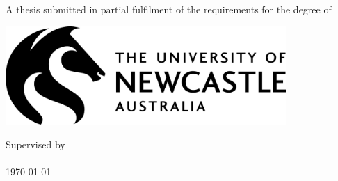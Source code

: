 \begin{titlepage}
\makeatletter

	\vspace*{\fill}
		
	\begin{flushleft}

		\begin{flushleft}
			\huge\textbf{\textsf{\@title}}
		\end{flushleft}

		\vspace{0.5cm}\par
		\LARGE\textbf{\@author}

		\vspace{0.5cm}\par
		\Large{A thesis submitted in partial fulfilment of the requirements for the degree of \degree}

	\end{flushleft}

	\vfill

	\begin{center}

		\begin{center}
			\includegraphics[width=0.8\textwidth]{images/title/uon_logo.jpg}
		\end{center}

		\large{Supervised by \supervisor \\ \institute \\ \today}

	\end{center}

	\vspace*{\fill}

\makeatother
\end{titlepage}
